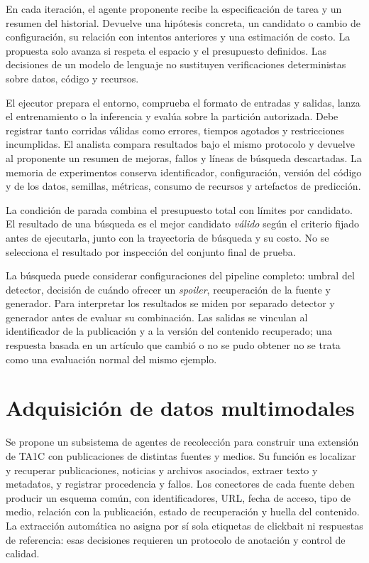 En cada iteración, el agente proponente recibe la especificación de tarea y un resumen del historial. Devuelve una hipótesis concreta, un candidato o cambio de configuración, su relación con intentos anteriores y una estimación de costo. La propuesta solo avanza si respeta el espacio y el presupuesto definidos. Las decisiones de un modelo de lenguaje no sustituyen verificaciones deterministas sobre datos, código y recursos.

El ejecutor prepara el entorno, comprueba el formato de entradas y salidas, lanza el entrenamiento o la inferencia y evalúa sobre la partición autorizada. Debe registrar tanto corridas válidas como errores, tiempos agotados y restricciones incumplidas. El analista compara resultados bajo el mismo protocolo y devuelve al proponente un resumen de mejoras, fallos y líneas de búsqueda descartadas. La memoria de experimentos conserva identificador, configuración, versión del código y de los datos, semillas, métricas, consumo de recursos y artefactos de predicción.

La condición de parada combina el presupuesto total con límites por candidato. El resultado de una búsqueda es el mejor candidato \emph{válido} según el criterio fijado antes de ejecutarla, junto con la trayectoria de búsqueda y su costo. No se selecciona el resultado por inspección del conjunto final de prueba.

La búsqueda puede considerar configuraciones del pipeline completo: umbral del detector, decisión de cuándo ofrecer un \emph{spoiler}, recuperación de la fuente y generador. Para interpretar los resultados se miden por separado detector y generador antes de evaluar su combinación. Las salidas se vinculan al identificador de la publicación y a la versión del contenido recuperado; una respuesta basada en un artículo que cambió o no se pudo obtener no se trata como una evaluación normal del mismo ejemplo.

\section{Adquisición de datos multimodales}

Se propone un subsistema de agentes de recolección para construir una extensión de TA1C con publicaciones de distintas fuentes y medios. Su función es localizar y recuperar publicaciones, noticias y archivos asociados, extraer texto y metadatos, y registrar procedencia y fallos. Los conectores de cada fuente deben producir un esquema común, con identificadores, URL, fecha de acceso, tipo de medio, relación con la publicación, estado de recuperación y huella del contenido. La extracción automática no asigna por sí sola etiquetas de clickbait ni respuestas de referencia: esas decisiones requieren un protocolo de anotación y control de calidad.

